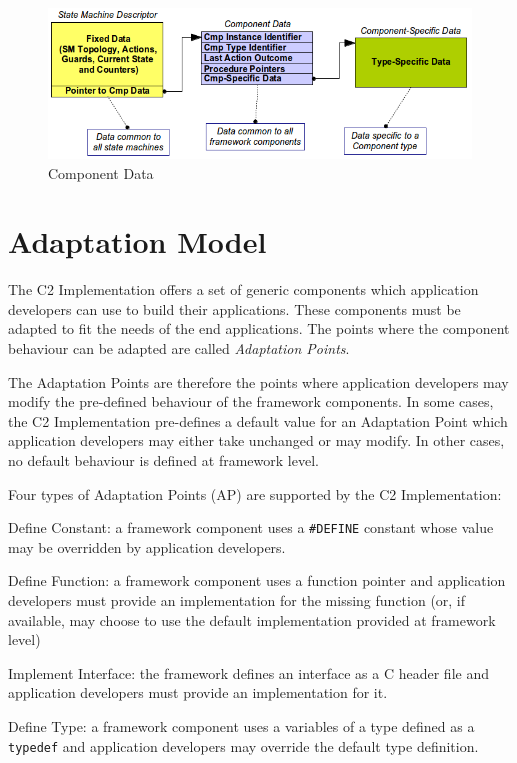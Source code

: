 \documentclass[a4paper,10pt]{article}
\let\stdsection\section
\renewcommand\section{\newpage\stdsection}
\newenvironment{fw_itemize}						%
{\begin{itemize}
  \setlength{\itemsep}{1mm}
  \setlength{\parskip}{0pt}
  \setlength{\parsep}{0pt}}
{\end{itemize}}
\begin{document}
\begin{figure}[h]
 \centering
 \includegraphics[scale=0.37,keepaspectratio=true]{CmpData.png}
 \caption{Component Data}
 \label{fig:CmpData}
\end{figure}

\section{Adaptation Model}\label{sec:AdaptationModel}
The C2 Implementation offers a set of generic components which application developers can use to build their applications. These components must be adapted to fit the needs of the end applications. The points where the component behaviour can be adapted are called \textit{Adaptation Points}.

The Adaptation Points are therefore the points where application developers may modify the pre-defined behaviour of the framework components. In some cases, the C2 Implementation pre-defines a default value for an Adaptation Point which application developers may either take unchanged or may modify. In other cases, no default behaviour is defined at framework level. 

Four types of Adaptation Points (AP) are supported by the C2 Implementation:

\begin{fw_itemize}
\item Define Constant: a framework component uses a \texttt{\#DEFINE} constant whose value may be overridden by application developers.
\item Define Function: a framework component uses a function pointer and application developers must provide an implementation for the missing function (or, if available, may choose to use the default implementation provided at framework level)
\item Implement Interface: the framework defines an interface as a C header file and application developers must provide an implementation for it.
\item Define Type: a framework component uses a variables of a type defined as a \texttt{typedef} and application developers may override the default type definition.
\end{fw_itemize}
\end{document}
